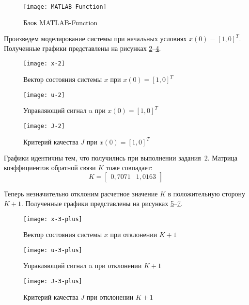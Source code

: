 \documentclass[14pt, a4paper]{extarticle}
\begin{document}
	\begin{figure}[H]
		\centering
		\texttt{[image: MATLAB-Function]}
		\caption{Блок MATLAB-Function}
		\label{fig:MATLAB-Function}
	\end{figure}
	
	Произведем моделирование системы при начальных условиях $x(0)=[1,0]^T$. Полученные графики представлены на рисунках \ref{fig:x-2}--\ref{fig:J-2}.
	
	\begin{figure}[H]
		\centering
		\texttt{[image: x-2]}
		\caption{Вектор состояния системы $x$ при $x(0)=[1,0]^T$}
		\label{fig:x-2}
	\end{figure}
	
	\begin{figure}[H]
		\centering
		\texttt{[image: u-2]}
		\caption{Управляющий сигнал $u$ при $x(0)=[1,0]^T$}
		\label{fig:u-2}
	\end{figure}
	
	\begin{figure}[H]
		\centering
		\texttt{[image: J-2]}
		\caption{Критерий качества $J$ при $x(0)=[1,0]^T$}
		\label{fig:J-2}
	\end{figure}
	
	Графики идентичны тем, что получились при выполнении задания~2. Матрица коэффициентов обратной связи $K$ тоже совпадает:
	$$K = \left[\begin{matrix}
		0,7071 & 1,0163
	\end{matrix}\right]$$
	
	Теперь незначительно отклоним расчетное значение $K$ в положительную сторону $K+1$. Полученные графики представлены на рисунках \ref{fig:x-3-plus}--\ref{fig:J-3-plus}.
	
	\begin{figure}[H]
		\centering
		\texttt{[image: x-3-plus]}
		\caption{Вектор состояния системы $x$ при отклонении $K+1$}
		\label{fig:x-3-plus}
	\end{figure}
	
	\begin{figure}[H]
		\centering
		\texttt{[image: u-3-plus]}
		\caption{Управляющий сигнал $u$ при отклонении $K+1$}
		\label{fig:u-3-plus}
	\end{figure}
	
	\begin{figure}[H]
		\centering
		\texttt{[image: J-3-plus]}
		\caption{Критерий качества $J$ при отклонении $K+1$}
		\label{fig:J-3-plus}
	\end{figure}
	
\end{document}
